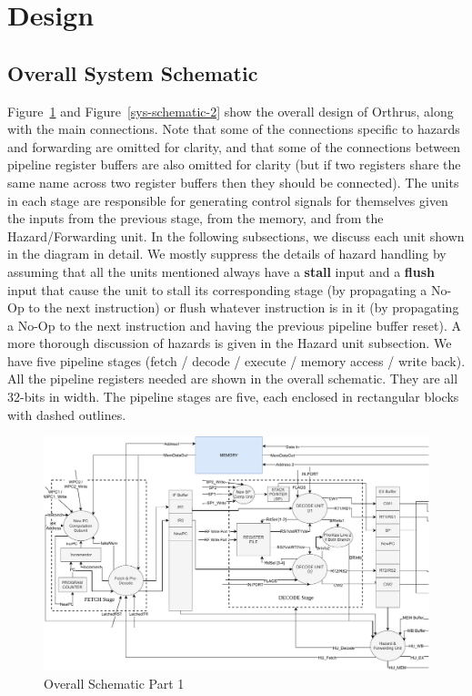 \documentclass[12pt]{article}
\theoremstyle{plain}
\theoremstyle{definition}
\begin{document}
\section{Design}
\subsection{Overall System Schematic}
Figure~\ref{sys-schematic-1} and Figure~\ref{sys-schematic-2} show the overall design of Orthrus, along with the main connections. Note that some of the connections specific to hazards and forwarding are omitted for clarity, and that some of the connections between pipeline register buffers are also omitted for clarity (but if two registers share the same name across two register buffers then they should be connected). The units in each stage are responsible for generating control signals for themselves given the inputs from the previous stage, from the memory, and from the Hazard/Forwarding unit. In the following subsections, we discuss each unit shown in the diagram in detail. We mostly suppress the details of hazard handling by assuming that all the units mentioned always have a \textbf{stall} input and a \textbf{flush} input that cause the unit to stall its corresponding stage (by propagating a No-Op to the next instruction) or flush whatever instruction is in it (by propagating a No-Op to the next instruction and having the previous pipeline buffer reset). A more thorough discussion of hazards is given in the Hazard unit subsection. We have five pipeline stages (fetch / decode / execute / memory access / write back). All the pipeline registers needed are shown in the overall schematic. They are all 32-bits in width. The pipeline stages are five, each enclosed in rectangular blocks with dashed outlines.
    \begin{figure}
        \centering
        \includegraphics[page=1]{Diagrams/SystemOverviewSplit}
        \caption{Overall Schematic Part 1}
        \label{sys-schematic-1}
    \end{figure}
\end{document}
